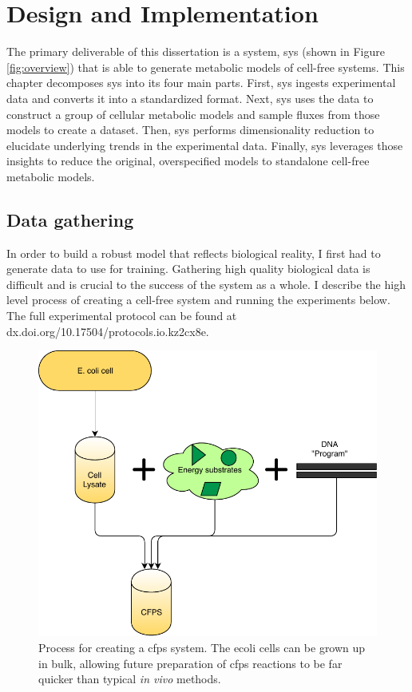 \chapter{Design and Implementation} \label{chap:impl}


The primary deliverable of this dissertation is a system, \gls{sys} (shown in Figure \ref{fig:overview}) that is able to generate metabolic models of cell-free systems.
This chapter decomposes \gls{sys} into its four main parts.
First, \gls{sys} ingests experimental data and converts it into a standardized format.
Next, \gls{sys} uses the data to construct a group of cellular metabolic models and sample fluxes from those models to create a dataset.
Then, \gls{sys} performs dimensionality reduction to elucidate underlying trends in the experimental data.
Finally, \gls{sys} leverages those insights to reduce the original, overspecified models to standalone cell-free metabolic models.

\section{Data gathering}
In order to build a robust model that reflects biological reality, I first had to generate data to use for training.
Gathering high quality biological data is difficult and is crucial to the success of the system as a whole.
I describe the high level process of creating a cell-free system and running the experiments below.
The full experimental protocol can be found at dx.doi.org/10.17504/protocols.io.kz2cx8e.

\begin{figure}[t!]
\begin{center}
\includegraphics{figs/CellFreeSetup.pdf}
\caption[Process for creating a \gls{cfps} system]{Process for creating a \gls{cfps} system.
The \gls{ecoli} cells can be grown up in bulk, allowing future preparation of \gls{cfps} reactions to be far quicker than typical \textit{in vivo} methods.
}
\end{center}
\label{fig:cfps}
\end{figure}

